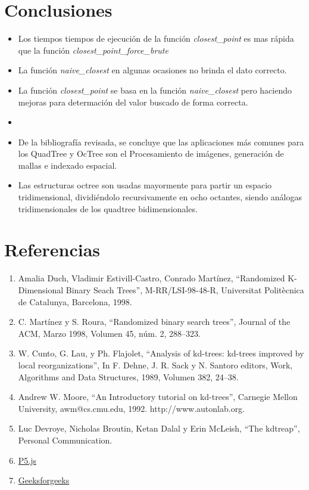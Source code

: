 \documentclass{article}
\begin{document}
\clearpage
\section{Conclusiones}
\begin{itemize}
	\item Los tiempos tiempos de ejecución de la función \textit{closest\_point} es mas rápida que la función \textit{closest\_point\_force\_brute}
	\item La función \textit{naive\_closest} en algunas ocasiones no brinda el dato correcto.
	\item La función \textit{closest\_point} se basa en la función \textit{naive\_closest} pero haciendo mejoras para determación del valor buscado de forma correcta.
	\item 
	\item De la bibliografía revisada, se concluye que las aplicaciones más comunes para los QuadTree y OcTree son el Procesamiento de imágenes, generación de mallas e indexado espacial.
	\item Las estructuras octree son usadas mayormente para partir un espacio tridimensional, dividiéndolo recursivamente en ocho octantes, siendo análogas tridimensionales de los quadtree bidimensionales.
\end{itemize}

\section{Referencias}
\begin{enumerate}
	\item Amalia Duch, Vladimir Estivill-Castro, Conrado Martínez, “Randomized K-Dimensional Binary Seach Trees”, M-RR/LSI-98-48-R, Universitat Politècnica de Catalunya, Barcelona, 1998.
	\item C. Martínez y S. Roura, “Randomized binary search trees”, Journal of the ACM, Marzo 1998, Volumen 45, núm. 2, 288$–$323.
	\item W. Cunto, G. Lau, y Ph. Flajolet, “Analysis of kd-trees: kd-trees improved by local reorganizations”, In F. Dehne, J. R. Sack y N. Santoro editors, Work, Algorithms and Data Structures, 1989, Volumen 382, 24$–$38.
	\item Andrew W. Moore, “An Introductory tutorial on kd-trees”, Carnegie Mellon University, awm@cs.cmu.edu, 1992. http://www.autonlab.org.
	\item Luc Devroye, Nicholas Broutin, Ketan Dalal y Erin McLeish, “The kdtreap”, Personal Communication.
	\item \href{https://p5js.org/es/libraries/}{P5.js}
	\item \href{https://www.geeksforgeeks.org/}{Geeksforgeeks}
\end{enumerate}
\end{document}
